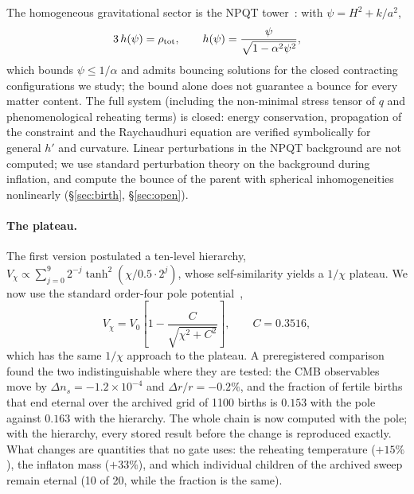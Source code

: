 \documentclass[11pt,a4paper]{article}
\begin{document}
The homogeneous gravitational sector is the NPQT tower~\cite{Bueno2025formation}: with $\psi = H^2 + k/a^2$,
\begin{equation}
3\,h(\psi) = \rho_{\rm tot},\qquad h(\psi) = \frac{\psi}{\sqrt{1-\alpha^2\psi^2}},
\label{eq:friedmann}
\end{equation}
which bounds $\psi \le 1/\alpha$ and admits bouncing solutions for the closed contracting configurations we study; the bound alone does not guarantee a bounce for every matter content.
The full system (including the non-minimal stress tensor of $q$ and phenomenological reheating terms) is closed: energy conservation, propagation of the constraint and the Raychaudhuri equation are verified symbolically for general $h'$ and curvature.
Linear perturbations in the NPQT background are not computed; we use standard perturbation theory on the background during inflation, and compute the bounce of the parent with spherical inhomogeneities nonlinearly (\S\ref{sec:birth}, \S\ref{sec:open}).

\paragraph{The plateau.}
The first version postulated a ten-level hierarchy, $V_\chi\propto\sum_{j=0}^{9}2^{-j}\tanh^2(\chi/0.5\cdot2^j)$, whose self-similarity yields a $1/\chi$ plateau.
We now use the standard order-four pole potential~\cite{GKLR2015},
\begin{equation}
V_\chi = V_0\left[1-\frac{C}{\sqrt{\chi^2+C^2}}\right],\qquad C = 0.3516,
\end{equation}
which has the same $1/\chi$ approach to the plateau.
A preregistered comparison found the two indistinguishable where they are tested: the CMB observables move by $\Delta n_s=-1.2\times10^{-4}$ and $\Delta r/r=-0.2\%$, and the fraction of fertile births that end eternal over the archived grid of 1100 births is $0.153$ with the pole against $0.163$ with the hierarchy.
The whole chain is now computed with the pole; with the hierarchy, every stored result before the change is reproduced exactly.
What changes are quantities that no gate uses: the reheating temperature ($+15\%$), the inflaton mass ($+33\%$), and which individual children of the archived sweep remain eternal (10 of 20, while the fraction is the same).
\end{document}

